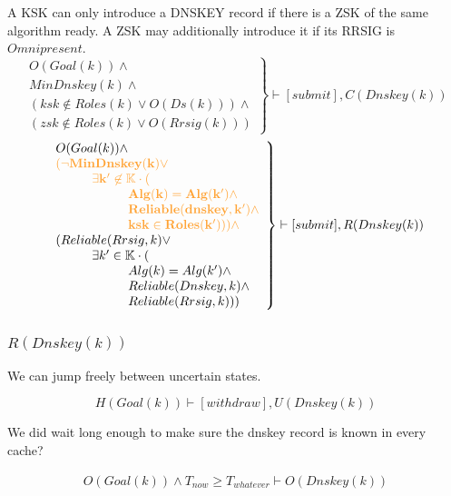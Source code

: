 \documentclass[twoside,english, a4paper]{article}
\newcommand{\highlightMinSig}[1]{\textcolor{MinSig}{\bf{#1}}}
\newcommand{\mathbox}[1]{#1}
\begin{document}
\mathbox{

	A KSK can only introduce a DNSKEY record if there is a ZSK of the
	same algorithm ready. A ZSK may additionally introduce it if its 
	RRSIG is $Omnipresent$.
\highlightMinSig{
	\begin{equation}
		\left.
		\begin{array}{l}
			O(Goal(k)) \wedge \\
			MinDnskey(k) \wedge \\
			(ksk \not \in Roles(k) \vee O(Ds(k))) \wedge \\
			(zsk \not \in Roles(k) \vee O(Rrsig(k)))
		\end{array}
		\right\} \vdash [submit], C(Dnskey(k))
	\end{equation}
}
	\begin{equation}
		\left.
		\begin{array}{l}
			O(Goal(k)) \wedge \\
\highlightMinSig{			(\neg MinDnskey(k) \vee}\\
\highlightMinSig{\hskip 1cm \exists k' \not \in \mathbb{K} \cdot (}\\
\highlightMinSig{\hskip 2cm	Alg(k)=Alg(k') \wedge}\\
\highlightMinSig{\hskip 2cm	Reliable(dnskey, k') \wedge }\\
\highlightMinSig{\hskip 2cm	ksk \in Roles(k'))) \wedge }\\
\hskip 0cm	(Reliable(Rrsig, k) \vee \\
\hskip 1cm	\exists k' \in \mathbb{K} \cdot ( \\
\hskip 2cm		Alg(k)=Alg(k') \wedge \\
\hskip 2cm		Reliable(Dnskey, k) \wedge \\
\hskip 2cm		Reliable(Rrsig, k)))\\
		\end{array}
		\right\} \vdash [submit], R(Dnskey(k))
	\end{equation}
}

\subsubsection{$R(Dnskey(k))$}

\mathbox{

	We can jump freely between uncertain states.
	
	\begin{equation}
			H(Goal(k)) \vdash [withdraw], U(Dnskey(k))
	\end{equation}

	We did wait long enough to make sure the dnskey record is known in 
	every cache?
	
	\begin{equation}
		\begin{split}
			O(Goal(k)) \wedge T_{now} \geq T_{whatever} \vdash O(Dnskey(k))
		\end{split}
	\end{equation}
}
\end{document}
